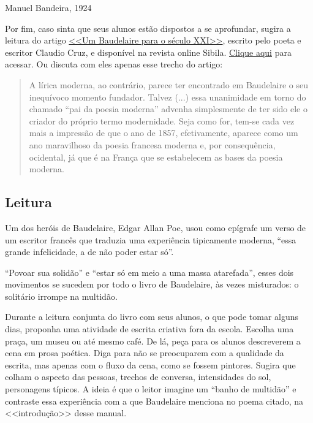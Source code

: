 \documentclass[12pt]{extarticle}
\begin{document}
\bigskip \hfill Manuel Bandeira, 1924

\pagebreak

Por fim, caso sinta que seus alunos estão dispostos a se aprofundar, 
sugira a leitura do artigo \href{}{<<Um Baudelaire para o século XXI>>}, 
escrito pelo poeta e escritor Claudio Cruz, e disponível na 
revista online Sibila. \href{http://sibila.com.br/novos-e-criticos/um-baudelaire-para-o-seculo-xxi/3579}{Clique aqui} para acessar. 
Ou discuta com eles apenas esse trecho do artigo:

\begin{quote}
A lírica moderna, ao contrário, parece ter encontrado em Baudelaire 
o seu inequívoco momento fundador. Talvez (...)
essa unanimidade em torno do chamado ``pai da poesia moderna'' advenha simplesmente 
de ter sido ele o criador do próprio termo modernidade. Seja como for, 
tem-se cada vez mais a impressão de que o ano de 1857, efetivamente, aparece como 
um ano maravilhoso da poesia francesa moderna e, por consequência, ocidental, já que 
é na França que se estabelecem as bases da poesia moderna.
\end{quote}

\subsection{Leitura}

Um dos heróis de Baudelaire, Edgar Allan Poe, usou como epígrafe um verso de 
um escritor francês que traduzia uma experiência tipicamente moderna, ``essa 
grande infelicidade, a de não poder estar só''.
 
``Povoar sua solidão'' e ``estar só em meio a uma massa atarefada'',  
esses dois movimentos se sucedem por todo o livro de Baudelaire, às vezes misturados:
o solitário irrompe na multidão.

Durante a leitura conjunta do livro com seus alunos, 
o que pode tomar alguns dias, proponha uma atividade de escrita criativa 
fora da escola. Escolha uma praça, um museu ou até mesmo café. De lá, peça para os 
alunos descreverem a cena em prosa poética. Diga para não se preocuparem com a qualidade
da escrita, mas apenas com o fluxo da cena, como se fossem pintores. Sugira que colham 
o aspecto das pessoas, trechos de conversa, intensidades do sol, personagens típicos.
A ideia é que o leitor imagine um ``banho de multidão'' e contraste essa experiência 
com a que Baudelaire menciona no poema citado, na <<introdução>> desse manual. 
\end{document}
